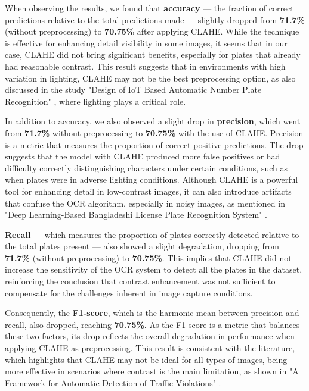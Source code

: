 \documentclass[conference]{IEEEtran}
\begin{document}
    When observing the results, we found that \textbf{accuracy} — the fraction of correct predictions relative to the total predictions made — slightly dropped from \textbf{71.7\%} (without preprocessing) to \textbf{70.75\%} after applying CLAHE. While the technique is effective for enhancing detail visibility in some images, it seems that in our case, CLAHE did not bring significant benefits, especially for plates that already had reasonable contrast. This result suggests that in environments with high variation in lighting, CLAHE may not be the best preprocessing option, as also discussed in the study "Design of IoT Based Automatic Number Plate Recognition" \cite{b10}, where lighting plays a critical role.
    
    In addition to accuracy, we also observed a slight drop in \textbf{precision}, which went from \textbf{71.7\%} without preprocessing to \textbf{70.75\%} with the use of CLAHE. Precision is a metric that measures the proportion of correct positive predictions. The drop suggests that the model with CLAHE produced more false positives or had difficulty correctly distinguishing characters under certain conditions, such as when plates were in adverse lighting conditions. Although CLAHE is a powerful tool for enhancing detail in low-contrast images, it can also introduce artifacts that confuse the OCR algorithm, especially in noisy images, as mentioned in "Deep Learning-Based Bangladeshi License Plate Recognition System" \cite{b11}.
    
    \textbf{Recall} — which measures the proportion of plates correctly detected relative to the total plates present — also showed a slight degradation, dropping from \textbf{71.7\%} (without preprocessing) to \textbf{70.75\%}. This implies that CLAHE did not increase the sensitivity of the OCR system to detect all the plates in the dataset, reinforcing the conclusion that contrast enhancement was not sufficient to compensate for the challenges inherent in image capture conditions.
    
    Consequently, the \textbf{F1-score}, which is the harmonic mean between precision and recall, also dropped, reaching \textbf{70.75\%}. As the F1-score is a metric that balances these two factors, its drop reflects the overall degradation in performance when applying CLAHE as preprocessing. This result is consistent with the literature, which highlights that CLAHE may not be ideal for all types of images, being more effective in scenarios where contrast is the main limitation, as shown in "A Framework for Automatic Detection of Traffic Violations" \cite{b12}.
    
\end{document}
